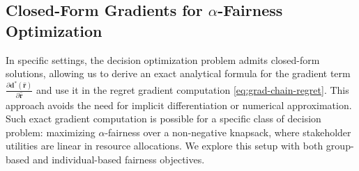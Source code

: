 \documentclass[ijoc,sglanonrev]{informs4}
\begin{document}
\subsection{Closed-Form Gradients for $\alpha$-Fairness Optimization} \label{sec:closed}
In specific settings, the decision optimization problem admits closed-form solutions, allowing us to derive an exact analytical formula for the gradient term $\frac{\partial \mathbf{d}^*(\hat{\mathbf{r}})}{\partial \hat{\mathbf{r}}}$ and use it in the regret gradient computation \eqref{eq:grad-chain-regret}. This approach avoids the need for implicit differentiation or numerical approximation. Such exact gradient computation is possible for a specific class of decision problem: maximizing $\alpha$-fairness over a non-negative knapsack, where stakeholder utilities are linear in resource allocations. We explore this setup with both group-based and individual-based fairness objectives. 
\end{document}
